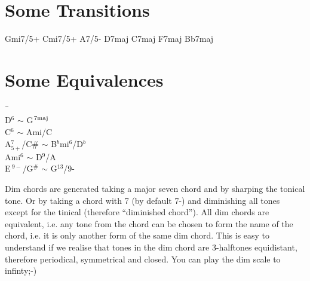 \documentclass[12pt]{article}
\begin{document}
\section{Some Transitions}
Gmi7/5+ Cmi7/5+ A7/5- D7maj C7maj F7maj Bb7maj

\section{Some Equivalences}

\begin{tabbing}
\hspace{2cm} \= \ \hspace{0.8cm} \= 
\\ D${}^6$          \> $\sim$ \> G${}^{7{\rm maj}}$
\\ C${}^6$          \> $\sim$ \> Ami/C
\\ A${}^7_{5+}$/C\# \> $\sim$ \> B${}^b$mi${}^{6}$/D${}^b$
\\ Ami${}^6$        \> $\sim$ \> D${}^{9}$/A
\\ E${\,}^{9-}$/G${}^{\#}$ \> $\sim $ \> G${}^{13}$/9-

\end{tabbing}

Dim chords are generated taking a major seven chord and by sharping the tonical tone.
Or by taking a chord with 7 (by default 7-) and diminishing all tones except for the tinical (therefore ``diminished chord''). All dim chords are equivalent, i.e. any tone from the chord can be chosen to form the name of the chord, i.e. it is only another form of the same dim chord. This is easy to understand if we realise that tones in the dim chord are 3-halftones equidistant, therefore periodical, symmetrical and closed. You can play the dim scale to infinty;-)
\end{document}
